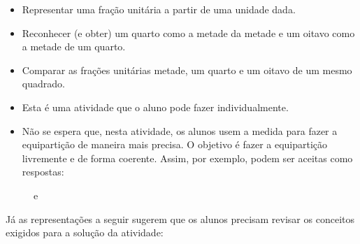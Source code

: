 \begin{atividade}\label{chap1-ativ8}
\objetivos
\begin{itemize} %
    \item       Representar uma fração unitária a partir de uma unidade dada.
    \item       Reconhecer (e obter) um quarto como a metade da metade e um oitavo como a metade de um quarto.
    \item       Comparar as frações unitárias metade, um quarto e um oitavo de um mesmo quadrado.
\end{itemize} %

\discussoes
\begin{itemize} %
    \item       Esta é uma atividade que o aluno pode fazer individualmente.
    \item       Não se espera que, nesta atividade, os alunos usem a medida para fazer a equipartição de maneira mais precisa. O objetivo é fazer a equipartição livremente e de forma coerente. Assim, por exemplo, podem ser aceitas como respostas:
\end{itemize} %

\begin{figure}[H]
\centering

\hspace{1ex}
e \hspace{1ex}
\end{figure}

  Já as representações a seguir sugerem que os alunos precisam revisar os conceitos exigidos para a solução da atividade:

\begin{figure}[H]
\centering

\end{figure}


\end{atividade}
